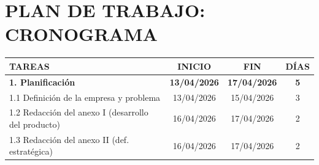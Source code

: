 \documentclass[11pt,a4paper]{article}
\begin{document}
\section{PLAN DE TRABAJO: CRONOGRAMA}
\begin{table}[htbp]

\begin{tabularx}{\textwidth}{|>{\raggedright\arraybackslash}X|c|c|c|}
\hline
\rowcolor{ArthroNavy}
\textbf{\color{white}TAREAS} & \textbf{\color{white}INICIO} & \textbf{\color{white}FIN} & \textbf{\color{white}DÍAS} \\ \hline
\textbf{1. Planificación} & \textbf{13/04/2026} & \textbf{17/04/2026} & \textbf{5} \\ \hline
\hspace{0.5cm} 1.1 Definición de la empresa y problema & 13/04/2026 & 15/04/2026 & 3 \\ \hline
\hspace{0.5cm} 1.2 Redacción del anexo I (desarrollo del producto) & 16/04/2026 & 17/04/2026 & 2 \\ \hline
\hspace{0.5cm} 1.3 Redacción del anexo II (def. estratégica) & 16/04/2026 & 17/04/2026 & 2 \\ \hline


\end{tabularx}
\end{table}
\end{document}
